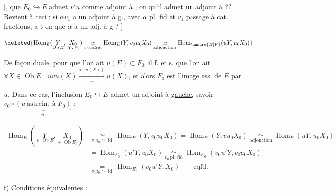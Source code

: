 
[,  que $E_0\hookrightarrow E$ admet $v'u$ comme adjoint à , ou qu'il admet un adjoint à  ?? Revient à ceci : si $\alpha v_1$ a un adjoint à g., avec $\alpha$ pl. fid et $v_1$ passage à cat. fractions, a-t-on que $\alpha$ a un adj. à g ? ]

\[
\deleted{\operatorname{Hom}_{E}(\underset{\operatorname{Ob}E}{Y},\underset{\operatorname{Ob}E_0}{X_0})\underset{v_0u_0\simeq\operatorname{id}}{\simeq}\operatorname{Hom}_{E}(Y,v_0u_0X_0)\underset{\text{adjonction}}{\simeq}\operatorname{Hom}_{\unsure{E|F}}(uY,u_0X_0)}
\]

De façon duale, pour que l'on ait $u(E)\subset F_0$, il f. et s. que l'on ait  $\forall X\in\operatorname{Ob}E\quad uvu(X)\xrightarrow[\sim]{j(u(X))}u(X)$, et alors $F_0$ est l'image ess. de $E$ par


$u$. Dans ce cas, l'inclusion $E_0\hookrightarrow E$ admet un adjoint à \uline{gauche}, savoir $v_0\circ\underbrace{(u\ \text{astreint à }F_0)}_{u'}$ :

\[
\begin{aligned}
\operatorname{Hom}_{E}(\underset{\in\operatorname{Ob}E}{Y},\underset{\in\operatorname{Ob}E_0}{X_0})
&\underset{v_0u_0\simeq\operatorname{id}}{\simeq}\operatorname{Hom}_{E}(Y,v_0u_0X_0)=\operatorname{Hom}_{E}(Y,vu_0X_0)\underset{\text{adjonction}}{\simeq}\operatorname{Hom}_{F}(uY,u_0X_0)\\
&=\operatorname{Hom}_{F_0}(u'Y,u_0X_0)\underset{v_0\,\text{pl. fid}}{\simeq}\operatorname{Hom}_{E_0}(v_0u'Y,v_0u_0X_0)\\
&\underset{v_0u_0\simeq\operatorname{id}}{=}\operatorname{Hom}_{E_0}(v_0u'Y,X_0)\qquad\text{cqfd.}
\end{aligned}
\]

f) Conditions équivalentes :


